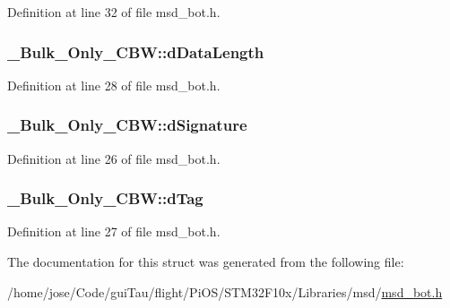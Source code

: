 Definition at line 32 of file msd\-\_\-bot.\-h.

\hypertarget{struct___bulk___only___c_b_w_ab6680907edce866e54a493d374529d99}{
\subsubsection[{d\-Data\-Length}]{ \-\_\-\-Bulk\-\_\-\-Only\-\_\-\-C\-B\-W\-::d\-Data\-Length}}\label{struct___bulk___only___c_b_w_ab6680907edce866e54a493d374529d99}


Definition at line 28 of file msd\-\_\-bot.\-h.

\hypertarget{struct___bulk___only___c_b_w_a69fb4197101a0865762f6eeeabfd2fc3}{
\subsubsection[{d\-Signature}]{ \-\_\-\-Bulk\-\_\-\-Only\-\_\-\-C\-B\-W\-::d\-Signature}}\label{struct___bulk___only___c_b_w_a69fb4197101a0865762f6eeeabfd2fc3}


Definition at line 26 of file msd\-\_\-bot.\-h.

\hypertarget{struct___bulk___only___c_b_w_a88450e01788f43e810892de0d7a2f7af}{
\subsubsection[{d\-Tag}]{ \-\_\-\-Bulk\-\_\-\-Only\-\_\-\-C\-B\-W\-::d\-Tag}}\label{struct___bulk___only___c_b_w_a88450e01788f43e810892de0d7a2f7af}


Definition at line 27 of file msd\-\_\-bot.\-h.



The documentation for this struct was generated from the following file\-:\begin{DoxyCompactItemize}
\item 
/home/jose/\-Code/gui\-Tau/flight/\-Pi\-O\-S/\-S\-T\-M32\-F10x/\-Libraries/msd/\hyperlink{msd__bot_8h}{msd\-\_\-bot.\-h}\end{DoxyCompactItemize}
